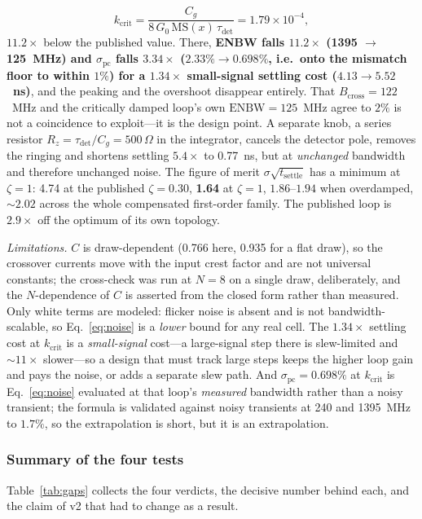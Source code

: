 \documentclass[11pt]{article}
\begin{document}
\[
k_{\mathrm{crit}} = \frac{C_g}{8\,G_0\,\mathrm{MS}(x)\,\tau_{\mathrm{det}}} = 1.79\times10^{-4},
\]
$11.2\times$ below the published value. There, \textbf{ENBW falls $11.2\times$ (1395 $\to$ 125~MHz) and $\sigma_{\mathrm{pc}}$ falls $3.34\times$ ($2.33\% \to 0.698\%$, i.e.\ onto the mismatch floor to within $1\%$) for a $1.34\times$ small-signal settling cost ($4.13 \to 5.52$~ns)}, and the peaking and the overshoot disappear entirely. That $B_{\mathrm{cross}} = 122$~MHz and the critically damped loop's own $\mathrm{ENBW} = 125$~MHz agree to $2\%$ is not a coincidence to exploit---it is the design point. A separate knob, a series resistor $R_z = \tau_{\mathrm{det}}/C_g = 500\,\Omega$ in the integrator, cancels the detector pole, removes the ringing and shortens settling $5.4\times$ to 0.77~ns, but at \textit{unchanged} bandwidth and therefore unchanged noise. The figure of merit $\sigma\sqrt{t_{\mathrm{settle}}}$ has a minimum at $\zeta = 1$: 4.74 at the published $\zeta = 0.30$, \textbf{1.64} at $\zeta=1$, $1.86$--$1.94$ when overdamped, ${\sim}2.02$ across the whole compensated first-order family. The published loop is $2.9\times$ off the optimum of its own topology.

\textit{Limitations.} $C$ is draw-dependent (0.766 here, 0.935 for a flat draw), so the crossover currents move with the input crest factor and are not universal constants; the cross-check was run at $N = 8$ on a single draw, deliberately, and the $N$-dependence of $C$ is asserted from the closed form rather than measured. Only white terms are modeled: flicker noise is absent and is not bandwidth-scalable, so Eq.~\eqref{eq:noise} is a \textit{lower} bound for any real cell. The $1.34\times$ settling cost at $k_{\mathrm{crit}}$ is a \textit{small-signal} cost---a large-signal step there is slew-limited and ${\sim}11\times$ slower---so a design that must track large steps keeps the higher loop gain and pays the noise, or adds a separate slew path. And $\sigma_{\mathrm{pc}} = 0.698\%$ at $k_{\mathrm{crit}}$ is Eq.~\eqref{eq:noise} evaluated at that loop's \textit{measured} bandwidth rather than a noisy transient; the formula is validated against noisy transients at 240 and 1395~MHz to $1.7\%$, so the extrapolation is short, but it is an extrapolation.

\subsubsection{Summary of the four tests}

Table~\ref{tab:gaps} collects the four verdicts, the decisive number behind each, and the claim of v2 that had to change as a result.
\end{document}
